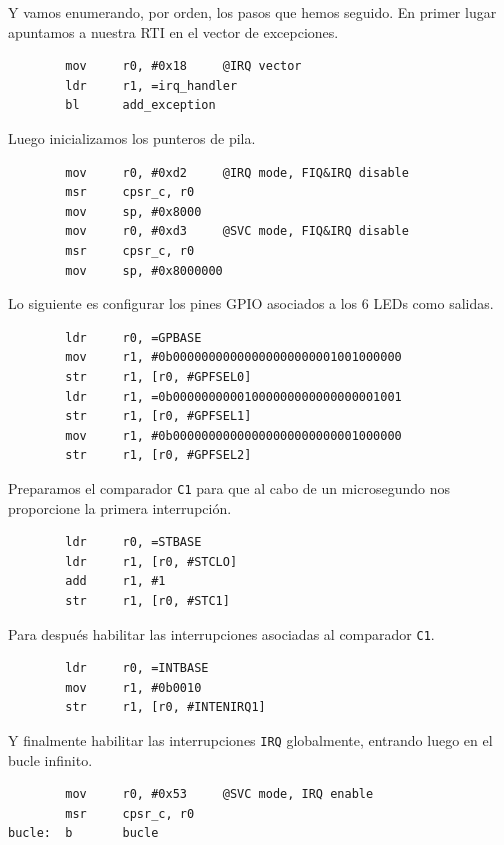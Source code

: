 Y vamos enumerando, por orden, los pasos que hemos seguido. En primer lugar apuntamos a nuestra
RTI en el vector de excepciones.

\begin{lstlisting}
        mov     r0, #0x18     @IRQ vector
        ldr     r1, =irq_handler
        bl      add_exception
\end{lstlisting}

Luego inicializamos los punteros de pila.

\begin{lstlisting}
        mov     r0, #0xd2     @IRQ mode, FIQ&IRQ disable
        msr     cpsr_c, r0
        mov     sp, #0x8000
        mov     r0, #0xd3     @SVC mode, FIQ&IRQ disable
        msr     cpsr_c, r0
        mov     sp, #0x8000000
\end{lstlisting}

Lo siguiente es configurar los pines GPIO asociados a los 6 LEDs como salidas.

\begin{lstlisting}
        ldr     r0, =GPBASE
        mov     r1, #0b00000000000000000000001001000000
        str     r1, [r0, #GPFSEL0]
        ldr     r1, =0b00000000001000000000000000001001
        str     r1, [r0, #GPFSEL1]
        mov     r1, #0b00000000000000000000000001000000
        str     r1, [r0, #GPFSEL2]
\end{lstlisting}

Preparamos el comparador {\tt C1} para que al cabo de un microsegundo nos proporcione la primera
interrupción.

\begin{lstlisting}
        ldr     r0, =STBASE
        ldr     r1, [r0, #STCLO]
        add     r1, #1
        str     r1, [r0, #STC1]
\end{lstlisting}

Para después habilitar las interrupciones asociadas al comparador {\tt C1}.

\begin{lstlisting}
        ldr     r0, =INTBASE
        mov     r1, #0b0010
        str     r1, [r0, #INTENIRQ1]
\end{lstlisting}

Y finalmente habilitar las interrupciones {\tt IRQ} globalmente, entrando luego en
el bucle infinito.

\begin{lstlisting}
        mov     r0, #0x53     @SVC mode, IRQ enable
        msr     cpsr_c, r0
bucle:  b       bucle
\end{lstlisting}

